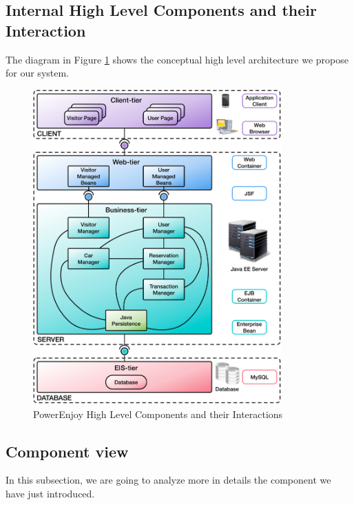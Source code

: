 \clearpage

\subsection{Internal High Level Components and their Interaction} \label{subsec:comp-inter}

The diagram in Figure \ref{fig:high-comp} shows the conceptual high level architecture we propose for our system.
\vspace{18pt}
\begin{figure}[htbp]
\centering
\includegraphics[width=0.85\textwidth]{Images/HighLevelComponents.pdf}
\vspace{10pt}
\caption{PowerEnjoy High Level Components and their Interactions}
\label{fig:high-comp}
\end{figure}
\clearpage

\subsection{Component view} \label{subsec:comp-view}
In this subsection, we are going to analyze more in details the component we have just introduced.

